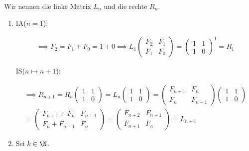 \begin{solution}

Wir nennen die linke Matrix $L_n$ und die rechte $R_n$.

\begin{enumerate}[label = \alph*.]

  \item IA($n = 1$):

  \begin{align*}
    \implies
    F_2 = F_1 + F_0 = 1 + 0
    \implies
    L_1
    \begin{pmatrix}
      F_2 & F_1 \\
      F_1 & F_0
    \end{pmatrix}
    =
    \begin{pmatrix}
      1 & 1 \\
      1 & 0
    \end{pmatrix}^1
    = R_1
  \end{align*}

  IS($n \mapsto n + 1$):

  \begin{multline*}
    \implies
    R_{n+1}
    =
    R_n
    \begin{pmatrix}
      1 & 1 \\
      1 & 0
    \end{pmatrix}
    =
    L_n
    \begin{pmatrix}
      1 & 1 \\
      1 & 0
    \end{pmatrix}
    =
    \begin{pmatrix}
      F_{n+1} & F_n \\
      F_n     & F_{n-1}
    \end{pmatrix}
    \begin{pmatrix}
      1 & 1 \\
      1 & 0
    \end{pmatrix} \\
    =
    \begin{pmatrix}
      F_{n+1} + F_n & F_{n+1} \\
      F_n + F_{n-1} & F_n
    \end{pmatrix}
    =
    \begin{pmatrix}
      F_{n+2} & F_{n+1} \\
      F_{n+1} & F_n
    \end{pmatrix}
    =
    L_{n+1}
  \end{multline*}

  \item Sei $k \in \N$.
  

\end{enumerate}
\end{solution}
